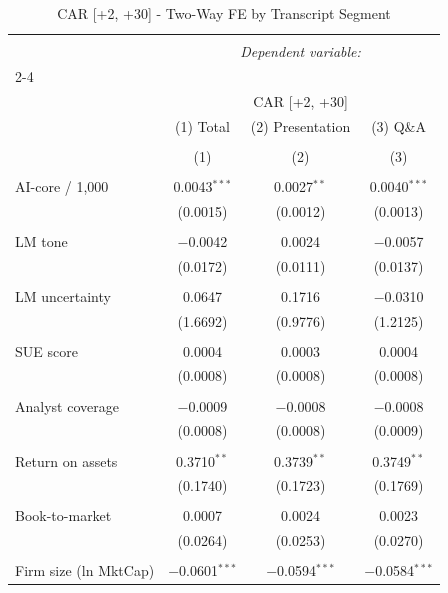 
\begin{table}[!htbp] \centering 
  \caption{CAR [+2, +30] - Two-Way FE by Transcript Segment} 
  \label{} 
\begin{tabular}{@{\extracolsep{5pt}}lccc} 
\\[-1.8ex]\hline 
\hline \\[-1.8ex] 
 & \multicolumn{3}{c}{\textit{Dependent variable:}} \\ 
\cline{2-4} 
\\[-1.8ex] & \multicolumn{3}{c}{CAR [+2, +30]} \\ 
 & (1) Total & (2) Presentation & (3) Q\&A \\ 
\\[-1.8ex] & (1) & (2) & (3)\\ 
\hline \\[-1.8ex] 
 AI-core / 1,000 & 0.0043$^{***}$ & 0.0027$^{**}$ & 0.0040$^{***}$ \\ 
  & (0.0015) & (0.0012) & (0.0013) \\ 
  & & & \\ 
 LM tone & $-$0.0042 & 0.0024 & $-$0.0057 \\ 
  & (0.0172) & (0.0111) & (0.0137) \\ 
  & & & \\ 
 LM uncertainty & 0.0647 & 0.1716 & $-$0.0310 \\ 
  & (1.6692) & (0.9776) & (1.2125) \\ 
  & & & \\ 
 SUE score & 0.0004 & 0.0003 & 0.0004 \\ 
  & (0.0008) & (0.0008) & (0.0008) \\ 
  & & & \\ 
 Analyst coverage & $-$0.0009 & $-$0.0008 & $-$0.0008 \\ 
  & (0.0008) & (0.0008) & (0.0009) \\ 
  & & & \\ 
 Return on assets & 0.3710$^{**}$ & 0.3739$^{**}$ & 0.3749$^{**}$ \\ 
  & (0.1740) & (0.1723) & (0.1769) \\ 
  & & & \\ 
 Book-to-market & 0.0007 & 0.0024 & 0.0023 \\ 
  & (0.0264) & (0.0253) & (0.0270) \\ 
  & & & \\ 
 Firm size (ln MktCap) & $-$0.0601$^{***}$ & $-$0.0594$^{***}$ & $-$0.0584$^{***}$ \\ 

\end{tabular}
\end{table}
